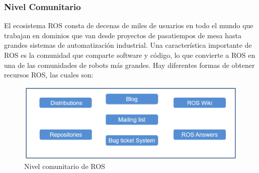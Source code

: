                \newpage
               
            \subsubsection{Nivel Comunitario}
            
            El ecosistema ROS consta de decenas de miles de usuarios en todo el mundo que trabajan en dominios que van desde proyectos de pasatiempos de mesa hasta grandes sistemas de automatización industrial. 
            Una característica importante de ROS es la comunidad que comparte software y código, lo que convierte a ROS en una de las comunidades de robots más grandes. Hay diferentes formas de obtener recursos ROS, las cuales son:

            \begin{figure}[htb]
                \centering
                \includegraphics[width=0.85\linewidth]{Main/Chapter3/Images3/n_s_a_15.png}
                \caption{Nivel comunitario de ROS \cite{lentin_2017}}
                \label{f:Cap3_conceptos_15}
            \end{figure}        
            
